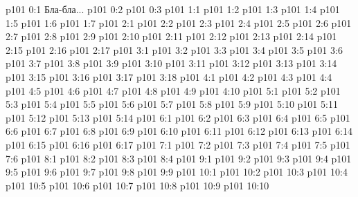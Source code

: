 \author{Мелхиседек}
\vs p101 0:1  Бла-бла...
\vs p101 0:2 
\vs p101 0:3 
\vs p101 1:1 
\vs p101 1:2 \pc 
\vs p101 1:3 
\vs p101 1:4 
\vs p101 1:5 \pc 
\vs p101 1:6 
\vs p101 1:7 
\vs p101 2:1 
\vs p101 2:2 
\vs p101 2:3 
\vs p101 2:4 
\vs p101 2:5 
\vs p101 2:6 
\vs p101 2:7 \pc 
\vs p101 2:8 \pc 
\vs p101 2:9 
\vs p101 2:10 \pc 
\vs p101 2:11 
\vs p101 2:12 \pc 
\vs p101 2:13 
\vs p101 2:14 
\vs p101 2:15 \pc 
\vs p101 2:16 
\vs p101 2:17 
\vs p101 3:1 
\vs p101 3:2 
\vs p101 3:3 
\vs p101 3:4 
\vs p101 3:5 
\vs p101 3:6 
\vs p101 3:7 
\vs p101 3:8 
\vs p101 3:9 
\vs p101 3:10 
\vs p101 3:11 
\vs p101 3:12 
\vs p101 3:13 
\vs p101 3:14 
\vs p101 3:15 
\vs p101 3:16 
\vs p101 3:17 \pc 
\vs p101 3:18 
\vs p101 4:1 
\vs p101 4:2 
\vs p101 4:3 \pc 
\vs p101 4:4 
\vs p101 4:5 \pc 
\vs p101 4:6 
\vs p101 4:7 
\vs p101 4:8 
\vs p101 4:9 
\vs p101 4:10 
\vs p101 5:1 
\vs p101 5:2 
\vs p101 5:3 
\vs p101 5:4 
\vs p101 5:5 \pc 
\vs p101 5:6 
\vs p101 5:7 
\vs p101 5:8 
\vs p101 5:9 \pc 
\vs p101 5:10 
\vs p101 5:11 
\vs p101 5:12 
\vs p101 5:13 \pc 
\vs p101 5:14 
\vs p101 6:1 
\vs p101 6:2 
\vs p101 6:3 \pc 
\vs p101 6:4 
\vs p101 6:5 \pc 
\vs p101 6:6 
\vs p101 6:7 \pc 
\vs p101 6:8 
\vs p101 6:9 
\vs p101 6:10 
\vs p101 6:11 
\vs p101 6:12 
\vs p101 6:13 
\vs p101 6:14 
\vs p101 6:15 
\vs p101 6:16 \pc 
\vs p101 6:17 
\vs p101 7:1 
\vs p101 7:2 
\vs p101 7:3 
\vs p101 7:4 \pc 
\vs p101 7:5 
\vs p101 7:6 
\vs p101 8:1 
\vs p101 8:2 
\vs p101 8:3 
\vs p101 8:4 
\vs p101 9:1 
\vs p101 9:2 
\vs p101 9:3 
\vs p101 9:4 
\vs p101 9:5 
\vs p101 9:6 \pc 
\vs p101 9:7 
\vs p101 9:8 
\vs p101 9:9 \pc 
{}
\vs p101 10:1 
\vs p101 10:2 
\vs p101 10:3 
\vs p101 10:4 
\vs p101 10:5 \pc 
\vs p101 10:6 \pc 
\vs p101 10:7 
\vs p101 10:8 
\vs p101 10:9 
\vsetoff
\vs p101 10:10 
\quizlink
